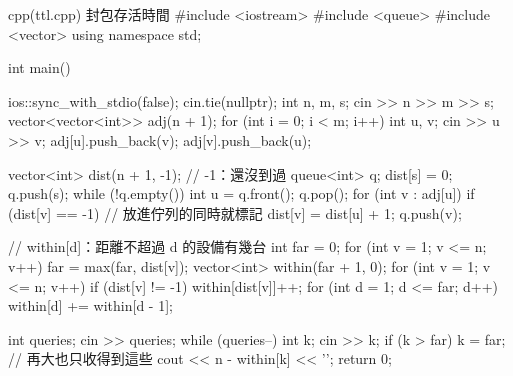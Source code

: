 \begin{example}[label=ex:ttl]{cpp}{(ttl.cpp) 封包存活時間}
#include <iostream>
#include <queue>
#include <vector>
using namespace std;

int main() {
    ios::sync_with_stdio(false);
    cin.tie(nullptr);
    int n, m, s;
    cin >> n >> m >> s;
    vector<vector<int>> adj(n + 1);
    for (int i = 0; i < m; i++) {
        int u, v;
        cin >> u >> v;
        adj[u].push_back(v);
        adj[v].push_back(u);
    }

    vector<int> dist(n + 1, -1);             // -1：還沒到過
    queue<int> q;
    dist[s] = 0;
    q.push(s);
    while (!q.empty()) {
        int u = q.front();
        q.pop();
        for (int v : adj[u]) {
            if (dist[v] == -1) {             // 放進佇列的同時就標記
                dist[v] = dist[u] + 1;
                q.push(v);
            }
        }
    }

    // within[d]：距離不超過 d 的設備有幾台
    int far = 0;
    for (int v = 1; v <= n; v++) {
        far = max(far, dist[v]);
    }
    vector<int> within(far + 1, 0);
    for (int v = 1; v <= n; v++) {
        if (dist[v] != -1) {
            within[dist[v]]++;
        }
    }
    for (int d = 1; d <= far; d++) {
        within[d] += within[d - 1];
    }

    int queries;
    cin >> queries;
    while (queries--) {
        int k;
        cin >> k;
        if (k > far) {
            k = far;                         // 再大也只收得到這些
        }
        cout << n - within[k] << '\n';
    }
    return 0;
}
\end{example}


